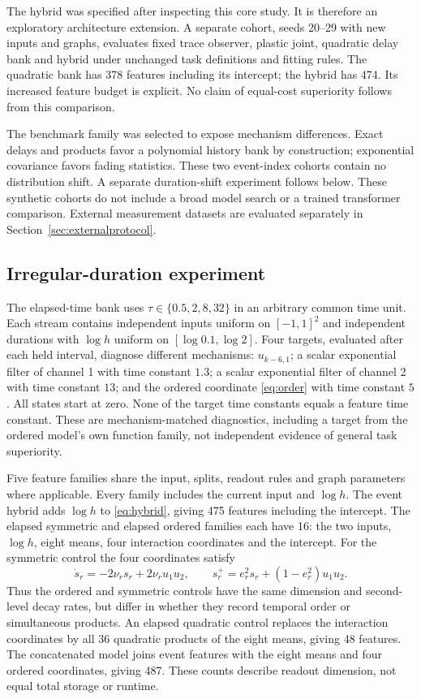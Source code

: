 \documentclass[11pt,a4paper]{article}
\theoremstyle{definition}\newtheorem{definition}[theorem]{Definition}
\begin{document}
The hybrid was specified after inspecting this core study. It is therefore an exploratory architecture extension. A separate cohort, seeds 20--29 with new inputs and graphs, evaluates fixed trace observer, plastic joint, quadratic delay bank and hybrid under unchanged task definitions and fitting rules. The quadratic bank has 378 features including its intercept; the hybrid has 474. Its increased feature budget is explicit. No claim of equal-cost superiority follows from this comparison.

The benchmark family was selected to expose mechanism differences. Exact delays and products favor a polynomial history bank by construction; exponential covariance favors fading statistics. These two event-index cohorts contain no distribution shift. A separate duration-shift experiment follows below. These synthetic cohorts do not include a broad model search or a trained transformer comparison. External measurement datasets are evaluated separately in Section~\ref{sec:externalprotocol}.

\subsection{Irregular-duration experiment}
The elapsed-time bank uses $\tau\in\{0.5,2,8,32\}$ in an arbitrary common time unit. Each stream contains independent inputs uniform on $[-1,1]^2$ and independent durations with $\log h$ uniform on $[\log0.1,\log2]$. Four targets, evaluated after each held interval, diagnose different mechanisms: $u_{k-6,1}$; a scalar exponential filter of channel 1 with time constant $1.3$; a scalar exponential filter of channel 2 with time constant $13$; and the ordered coordinate \eqref{eq:order} with time constant $5$. All states start at zero. None of the target time constants equals a feature time constant. These are mechanism-matched diagnostics, including a target from the ordered model's own function family, not independent evidence of general task superiority.

Five feature families share the input, splits, readout rules and graph parameters where applicable. Every family includes the current input and $\log h$. The event hybrid adds $\log h$ to \eqref{eq:hybrid}, giving 475 features including the intercept. The elapsed symmetric and elapsed ordered families each have 16: the two inputs, $\log h$, eight means, four interaction coordinates and the intercept. For the symmetric control the four coordinates satisfy
\begin{equation}
 \dot s_r=-2\nu_r s_r+2\nu_r u_1u_2,\qquad
 s_r^+=e_r^2s_r+(1-e_r^2)u_1u_2.
\end{equation}
Thus the ordered and symmetric controls have the same dimension and second-level decay rates, but differ in whether they record temporal order or simultaneous products. An elapsed quadratic control replaces the interaction coordinates by all 36 quadratic products of the eight means, giving 48 features. The concatenated model joins event features with the eight means and four ordered coordinates, giving 487. These counts describe readout dimension, not equal total storage or runtime.
\end{document}
